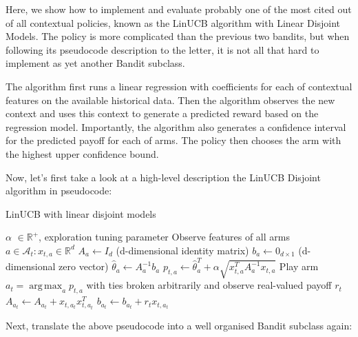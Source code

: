 \documentclass[nojss]{jss}\usepackage[]{graphicx}\usepackage[]{color}
\DeclareMathOperator*{\argmax}{arg\,max}
\begin{document}
Here, we show how to implement and evaluate probably one of the most cited out of all contextual policies, known as the LinUCB algorithm with Linear Disjoint Models. The policy is more complicated than the previous two bandits, but when following its pseudocode description to the letter, it is not all that hard to implement as yet another Bandit subclass.

The algorithm first runs a linear regression with coefficients for each of  contextual features on the available historical data. Then the algorithm observes the new context and uses this context to generate a predicted reward based on the regression model. Importantly, the algorithm also generates a confidence interval for the predicted payoff for each of  arms. The policy then chooses the arm with the highest upper confidence bound.

Now, let's first take a look at a high-level description the LinUCB Disjoint algorithm in pseudocode:

\begin{algorithm}[H]
\caption{LinUCB with linear disjoint models}
\label{Alg:LinUCBDisjoint}
\begin{algorithmic}
\REQUIRE $\alpha$ \(  \in \mathbb{R}^{+} \), exploration tuning parameter
          \STATE Observe features of all arms \(  a \in \mathcal{A}_{t}: x_{t,a} \in \mathbb{R}^{d}\)
		      \STATE \(A_{a} \leftarrow I_{d}  \)  (d-dimensional identity matrix)
		      \STATE \(b_{a} \leftarrow 0_{d\times1}   \) (d-dimensional zero vector)
		\ENDIF
		\STATE \( \hat{\theta}_{a} \leftarrow A_{a}^{-1}b_{a} \)
		\STATE \( p_{t,a} \leftarrow \hat{\theta}_{a}^{T} + \alpha  \sqrt{ x_{t,a}^{T} A_{a}^{-1}x_{t,a}} \)
	\ENDFOR
	\STATE Play arm \(a_t = \argmax_a  p_{t,a}  \) with ties broken arbitrarily and observe real-valued payoff $r_t$
           \STATE \( A_{a_{t}} \leftarrow A_{a_{t}}+ x_{t,a_{t}}x_{t,a_{t}}^{T} \)
           \STATE  \( b_{a_{t}} \leftarrow b_{a_{t}}+ r_{t}x_{t,a_{t}}  \)
\ENDFOR
\end{algorithmic}
\end{algorithm}

Next, translate the above pseudocode into a well organised Bandit subclass again:
\end{document}
